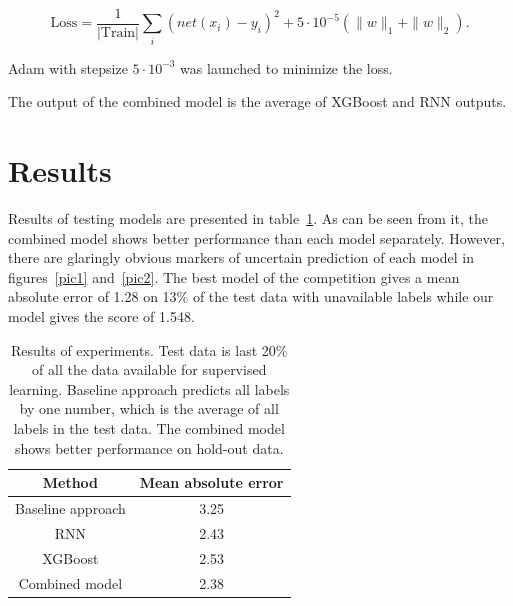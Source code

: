 \documentclass[12pt, a4paper]{article}
\begin{document}
$$
\text{Loss} = \frac{1}{|{\text{Train}}|} \sum\limits_i (net(x_i) - y_i)^2 + 5 \cdot 10^{-5} (\| w \|_1 + \| w \|_2).
$$

Adam with stepsize $5 \cdot 10^{-3}$ was launched to minimize the loss.

The output of the combined model is the average of XGBoost and RNN outputs.

\section{Results}

Results of testing models are presented in table~\ref{tab}. As can be seen from it, the combined model shows better performance than each model separately. However, 
there are glaringly obvious markers of uncertain prediction of each model in figures~\ref{pic1} and~\ref{pic2}. The best model of the competition gives a mean absolute error of 1.28 on 13\% of the test data with unavailable labels while our model gives the score of 1.548.

\begin{table}
\centering
\begin{tabular}{|c|c|}
\hline
Method & Mean absolute error \\
\hline
Baseline approach & 3.25 \\
\hline
RNN & 2.43 \\
\hline
XGBoost & 2.53 \\
\hline
Combined model & 2.38 \\
\hline
\end{tabular}
\caption{Results of experiments. Test data is last 20\% of all the data available for supervised learning. Baseline approach predicts all labels by one number, which is the average of all labels in the test data. The combined model shows better performance on hold-out data.}
\label{tab}
\end{table}
\end{document}
